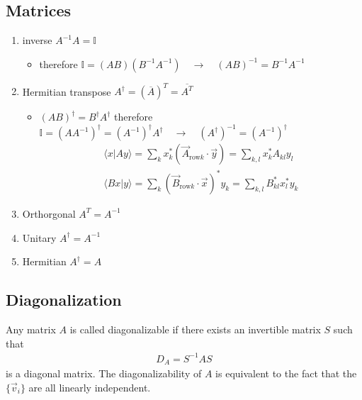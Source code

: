 \documentclass[10pt,a4paper]{article}
\theoremstyle{definition}
\begin{document}
\begin{center}
\end{center}


\subsection{Matrices}
\begin{enumerate}
    \item inverse $A^{-1}A=\mathbb{I}$
    \begin{itemize}
        \item therefore $\mathbb{I}=(AB)(B^{-1}A^{-1})\quad\rightarrow\quad (AB)^{-1}=B^{-1}A^{-1}$
    \end{itemize}
    \item Hermitian transpose $A^\dagger = (\overline{A})^T = \overline{A^T}$
        \begin{itemize}
        \item $(AB)^\dagger=B^\dagger A^\dagger$ therefore $\mathbb{I}=(AA^{-1})^\dagger=(A^{-1})^\dagger A^\dagger\quad\rightarrow\quad (A^\dagger)^{-1}=(A^{-1})^\dagger$
        \begin{align}
        \langle x |A y\rangle=\sum_k x_k^* (\vec{A}_{\text{row}k}\cdot\vec{y})=\sum_{k,l} x_k^* A_{kl}y_l\\
        \langle Bx |y\rangle = \sum_k(\vec{B}_{\text{row}k}\cdot \vec{x})^*y_k= \sum_{k,l}B_{kl}^*x_l^*y_k
        \end{align}
    \end{itemize}
    \item Orthorgonal $A^T = A^{-1}$
    \item Unitary $A^\dagger = A^{-1}$
    \item Hermitian $A^\dagger = A$
\end{enumerate}

\subsection{Diagonalization}
Any  matrix $A$ is called diagonalizable if there exists an invertible matrix $S$ such that
\begin{align}
    D_A=S^{-1}AS
\end{align}
is a diagonal matrix. The diagonalizability of $A$ is equivalent to the fact that the $\{\vec{v}_i\}$ are all linearly independent.
\end{document}
